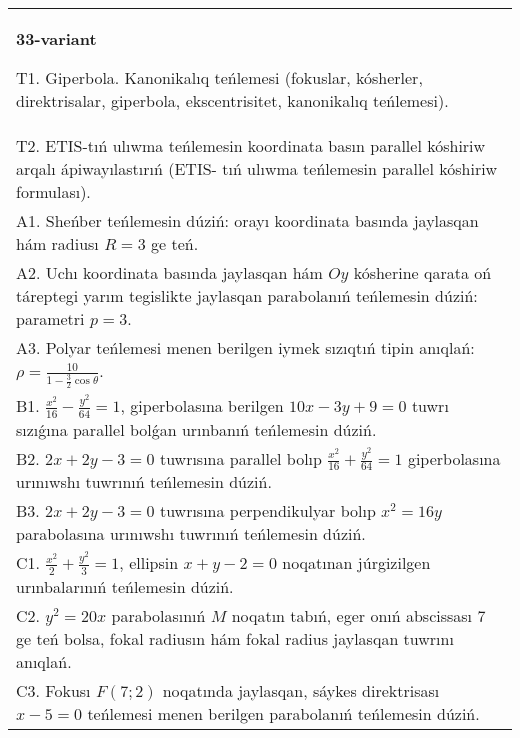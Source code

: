 \documentclass{article}
\begin{document}
\begin{tabular}{m{17cm}}
\textbf{33-variant}
\newline

T1. Giperbola. Kanonikalıq teńlemesi (fokuslar, kósherler, direktrisalar, giperbola, ekscentrisitet, kanonikalıq teńlemesi).\\

T2. ETIS-tıń ulıwma teńlemesin koordinata basın parallel kóshiriw arqalı ápiwayılastırıń (ETIS- tıń ulıwma teńlemesin parallel kóshiriw formulası).\\

A1. Sheńber teńlemesin dúziń: orayı koordinata basında jaylasqan hám radiusı $R=3$ ge teń.\\

A2. Uchı koordinata basında jaylasqan hám $Oy$ kósherine qarata oń táreptegi yarım tegislikte jaylasqan parabolanıń teńlemesin dúziń: parametri $p=3$.\\

A3. Polyar teńlemesi menen berilgen iymek sızıqtıń tipin anıqlań: $\rho=\frac{10}{1-\frac{3}{2}\cos\theta}$.\\

B1. $\frac{x^{2}}{16} - \frac{y^{2}}{64} = 1$, giperbolasına berilgen $10x - 3y + 9 = 0$ tuwrı sızıǵına parallel bolǵan urınbanıń teńlemesin dúziń.  \\

B2. $2x + 2y - 3 = 0$ tuwrısına parallel bolıp $\frac{x^{2}}{16} + \frac{y^{2}}{64} = 1$ giperbolasına urınıwshı tuwrınıń teńlemesin dúziń.  \\

B3. $2x + 2y - 3 = 0$ tuwrısına perpendikulyar bolıp $x^{2} = 16y$ parabolasına urınıwshı tuwrınıń teńlemesin dúziń.  \\

C1. $\frac{x^{2}}{2} + \frac{y^{2}}{3} = 1$, ellipsin $x + y - 2 = 0$ noqatınan júrgizilgen urınbalarınıń teńlemesin dúziń.  \\

C2. $y^{2} = 20x$ parabolasınıń $M$ noqatın tabıń, eger onıń abscissası 7 ge teń bolsa, fokal radiusın hám fokal radius jaylasqan tuwrını anıqlań.\\

C3. Fokusı $F(7;2)$ noqatında jaylasqan, sáykes direktrisası $x - 5 = 0$ teńlemesi menen berilgen parabolanıń teńlemesin dúziń.  \\

\end{tabular}
\vspace{1cm}
\end{document}
